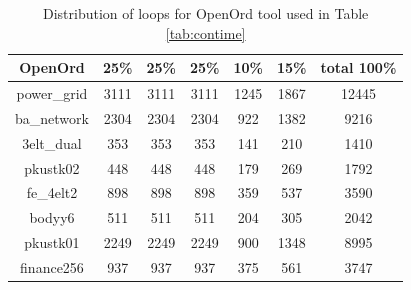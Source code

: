 \documentclass[conference]{article}
\begin{document}
\begin{table}[!htp]
\caption{Distribution of loops for OpenOrd tool used in Table \ref{tab:contime}}
\centering
\begin{tabular}{|c|c|c|c|c|c|c|}
\hline
\textbf{OpenOrd} & \textbf{25\%} & \textbf{25\%} & \textbf{25\%} & \textbf{10\%} & \textbf{15\%} & \textbf{total 100\%} \\ \hline
power\_grid      & 3111          & 3111          & 3111          & 1245          & 1867          & 12445                \\ \hline
ba\_network      & 2304          & 2304          & 2304          & 922           & 1382          & 9216                 \\ \hline
3elt\_dual       & 353           & 353           & 353           & 141           & 210           & 1410                 \\ \hline
pkustk02         & 448           & 448           & 448           & 179           & 269           & 1792                 \\ \hline
fe\_4elt2        & 898           & 898           & 898           & 359           & 537           & 3590                 \\ \hline
bodyy6           & 511           & 511           & 511           & 204           & 305           & 2042                 \\ \hline
pkustk01         & 2249          & 2249          & 2249          & 900           & 1348          & 8995                 \\ \hline
finance256       & 937           & 937           & 937           & 375           & 561           & 3747                 \\ \hline

\end{tabular}
\end{table}
\end{document}
